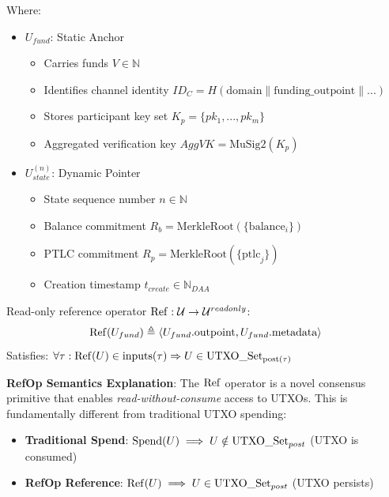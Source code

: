 Where:
\begin{itemize}
    \item \textbf{$U_{fund}$}: Static Anchor
    \begin{itemize}
        \item Carries funds $V \in \mathbb{N}$
        \item Identifies channel identity $ID_C = H(\text{domain} \| \text{funding\_outpoint} \| ...)$
        \item Stores participant key set $K_p = \{pk_1, ..., pk_m\}$
        \item Aggregated verification key $AggVK = \text{MuSig2}(K_p)$
    \end{itemize}
    
    \item \textbf{$U_{state}^{(n)}$}: Dynamic Pointer
    \begin{itemize}
        \item State sequence number $n \in \mathbb{N}$
        \item Balance commitment $R_b = \text{MerkleRoot}(\{\text{balance}_i\})$
        \item PTLC commitment $R_p = \text{MerkleRoot}(\{\text{ptlc}_j\})$
        \item Creation timestamp $t_{create} \in \mathbb{N}_{DAA}$
    \end{itemize}
\end{itemize}

\begin{definition}
Read-only reference operator $\operatorname{Ref}: \mathcal{U} \to \mathcal{U}^{readonly}$:
$$\operatorname{Ref}(U_{fund}) \triangleq \langle U_{fund}.\text{outpoint}, U_{fund}.\text{metadata} \rangle$$
Satisfies: $\forall \tau: \operatorname{Ref}(U) \in \text{inputs}(\tau) \Rightarrow U \in \text{UTXO\_Set}_{\text{post}(\tau)}$
\end{definition}

\textbf{RefOp Semantics Explanation}:
The $\operatorname{Ref}$ operator is a novel consensus primitive that enables \textit{read-without-consume} access to UTXOs. This is fundamentally different from traditional UTXO spending:

\begin{itemize}
    \item \textbf{Traditional Spend}: $\operatorname{Spend}(U) \implies U \notin \text{UTXO\_Set}_{post}$ (UTXO is consumed)
    \item \textbf{RefOp Reference}: $\operatorname{Ref}(U) \implies U \in \text{UTXO\_Set}_{post}$ (UTXO persists)
\end{itemize}

